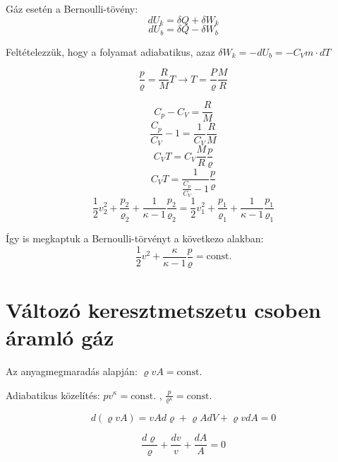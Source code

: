 \documentclass[a4paper,titlepage,12pt]{article}
\begin{document}
Gáz esetén a Bernoulli-tövény: 
\begin{equation*}
dU_{k}=\delta Q+\delta W_{k}
\end{equation*} 
\begin{equation*}
dU_{b}=\delta Q-\delta W_{b} 
\end{equation*}

Feltételezzük, hogy a folyamat adiabatikus, azaz $\delta W_{k}=-dU_{b}=-C_{V}m \cdot dT$

\begin{equation*}
\frac{p}{\varrho}=\frac{R}{M}T\longrightarrow T=\frac{P}{\varrho}\frac{M}{R}
\end{equation*}

\begin{equation*}
 C_{p}-C_{V}=\frac{R}{M} 
\end{equation*}  
\begin{equation*}
\frac{C_{p}}{C_{V}}-1=\frac{1}{C_{V}}\frac{R}{M} 
\end{equation*} 
\begin{equation*}
C_{V}T=C_{V}\frac{M}{R}\frac{p}{\varrho} 
\end{equation*} 
\begin{equation*}
 C_{V}T=\frac{1}{\frac{C_{p}}{C_{V}}-1}\frac{p}{\varrho} 
\end{equation*} 
\begin{equation*}
\frac{1}{2}v_{2}^{2}+\frac{p_{2}}{\varrho_{2}}+\frac{1}{\kappa-1}\frac{p_{2}}{\varrho_{2}}=\frac{1}{2}v_{1}^{2}+\frac{p_{1}}{\varrho_{1}}+\frac{1}{\kappa-1}\frac{p_{1}}{\varrho_{1}} 
\end{equation*}

Így is megkaptuk a Bernoulli-törvényt a következo alakban: \[\frac{1}{2}v^{2}+\frac{\kappa}{\kappa-1}\frac{p}{\varrho}=\text{const}.\]

\part*{Változó keresztmetszetu csoben áramló gáz}

Az anyagmegmaradás alapján: $\varrho vA = \text{const}$.

Adiabatikus közelítés: $pv^{\kappa}=\text{const}$. , $\frac{p}{\varrho^{\kappa}}=\text{const}$.

\begin{equation*}
d(\varrho vA)=vAd\varrho+\varrho AdV+\varrho vdA=0 
\end{equation*}

\begin{equation*}
\frac{d\varrho}{\varrho}+\frac{dv}{v}+\frac{dA}{A}=0 
\end{equation*}
\end{document}
